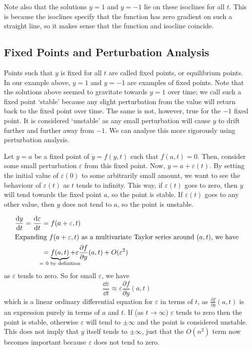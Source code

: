 \documentclass{article}
\begin{document}
Note also that the solutions $y = 1$ and $y = -1$ lie on these isoclines for all $t$. This is because the isoclines specify that the function has zero gradient on such a straight line, so it makes sense that the function and isocline coincide.

\subsection{Fixed Points and Perturbation Analysis}
Points such that $y$ is fixed for all $t$ are called fixed points, or equilibrium points. In our example above, $y=1$ and $y=-1$ are examples of fixed points. Note that the solutions above seemed to gravitate towards $y=1$ over time; we call such a fixed point `stable' because any slight perturbation from the value will return back to the fixed point over time. The same is not, however, true for the $-1$ fixed point. It is considered `unstable' as any small perturbation will cause $y$ to drift further and further away from $-1$. We can analyse this more rigorously using perturbation analysis.

Let $y = a$ be a fixed point of $\dot y = f(y, t)$ such that $f(a, t) = 0$. Then, consider some small perturbation $\varepsilon$ from this fixed point. Now, $y = a + \varepsilon(t)$. By setting the initial value of $\varepsilon(0)$ to some arbitrarily small amount, we want to see the behaviour of $\varepsilon(t)$ as $t$ tends to infinity. This way, if $\varepsilon(t)$ goes to zero, then $y$ will tend towards the fixed point $a$, so the point is stable. If $\varepsilon(t)$ goes to any other value, then $y$ does not tend to $a$, so the point is unstable.

\begin{align*}
	\frac{\dd{y}}{\dd{t}} = \frac{\dd \varepsilon}{\dd{t}} & = f(a + \varepsilon, t)                                                                                                            \\
	\intertext{Expanding $f(a + \varepsilon, t)$ as a multivariate Taylor series around $(a, t)$, we have}
	                                                       & = \underbrace{f(a, t)}_{\mathclap{=\ 0\text{ by definition}}} + \varepsilon \frac{\partial f}{\partial y}(a, t) + O(\varepsilon^2)
\end{align*}
as $\varepsilon$ tends to zero. So for small $\varepsilon$, we have
\[ \frac{\dd \varepsilon}{\dd{t}} \approx \varepsilon \frac{\partial f}{\partial y}(a, t) \]
which is a linear ordinary differential equation for $\varepsilon$ in terms of $t$, as $\frac{\partial f}{\partial y}(a, t)$ is an expression purely in terms of $a$ and $t$. If (as $t \to \infty$) $\varepsilon$ tends to zero then the point is stable, otherwise $\varepsilon$ will tend to $\pm \infty$ and the point is considered unstable. This does not imply that $y$ itself tends to $\pm \infty$, just that the $O(n^2)$ term now becomes important because $\varepsilon$ does not tend to zero.
\end{document}
